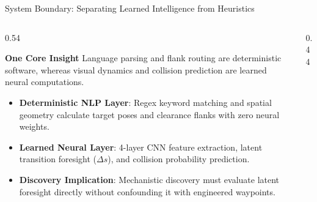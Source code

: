 \documentclass[aspectratio=169, 10pt]{beamer}
\begin{document}
\begin{frame}{System Boundary: Separating Learned Intelligence from Heuristics}
  \begin{columns}
    \begin{column}{0.54\textwidth}
      \begin{block}{\textbf{One Core Insight}}
        Language parsing and flank routing are deterministic software, whereas visual dynamics and collision prediction are learned neural computations.
      \end{block}
      \vspace{0.3em}
      \begin{itemize}
        \footnotesize
        \item \textbf{Deterministic NLP Layer}: Regex keyword matching and spatial geometry calculate target poses and clearance flanks with zero neural weights.
        \item \textbf{Learned Neural Layer}: 4-layer CNN feature extraction, latent transition foresight ($\Delta s$), and collision probability prediction.
        \item \textbf{Discovery Implication}: Mechanistic discovery must evaluate latent foresight directly without confounding it with engineered waypoints.
      \end{itemize}
    \end{column}
    \begin{column}{0.44\textwidth}
      \centering
    \end{column}
  \end{columns}
\end{frame}
\end{document}
